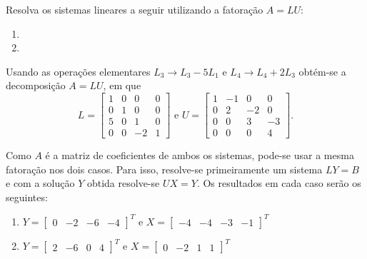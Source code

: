 \documentclass[12pt,a4paper]{article}
\begin{document}
\begin{ExerciseList}
\Exercise[title={2,5}]
Resolva os sistemas lineares a seguir utilizando a fatoração $A = LU$:
\begin{multicols}{2}
\begin{enumerate}
\item {}
\item {}
\end{enumerate}
\end{multicols}
\Answer Usando as operações elementares $L_3 \to L_3 - 5L_1$ e $L_4 \to L_4 + 2L_3$ obtém-se a decomposição $A = LU$, em que
\[
L=
\begin{bmatrix}
1 & 0 &  0 & 0\\
0 & 1 &  0 & 0\\
5 & 0 &  1 & 0\\
0 & 0 & -2 & 1
\end{bmatrix}
\text{ e }
U=\begin{bmatrix}
1 & -1 &  0 &  0\\
0 &  2 & -2 &  0\\
0 &  0 &  3 & -3\\
0 &  0 &  0 &  4
\end{bmatrix}.
\]

Como $A$ é a matriz de coeficientes de ambos os sistemas, pode-se usar a mesma fatoração nos dois casos. Para isso, resolve-se primeiramente um sistema $LY=B$ e com a solução $Y$ obtida resolve-se $UX = Y$. Os resultados em cada caso serão os seguintes:

\begin{enumerate}
\item
$
 Y  =
\begin{bmatrix}
0 & -2 & -6 & -4
\end{bmatrix}^T
\text{ e }
X =\begin{bmatrix}
-4 & -4 & -3 & -1
\end{bmatrix}^T
$
\item
$
 Y  =
\begin{bmatrix}
2 & -6 & 0 & 4
\end{bmatrix}^T
\text{ e }
 X  =
\begin{bmatrix}
0 & -2 & 1 & 1
\end{bmatrix}^T
$
\end{enumerate}


\end{ExerciseList}
\end{document}
